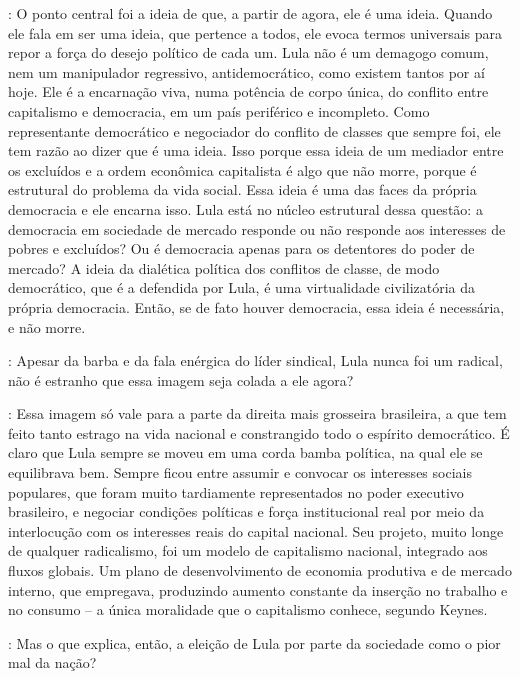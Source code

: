 \noindent{}: O ponto central foi a ideia de que, a partir de agora, ele é uma ideia.
Quando ele fala em ser uma ideia, que pertence a todos, ele evoca termos
universais para repor a força do desejo político de cada um. Lula não é
um demagogo comum, nem um manipulador regressivo, antidemocrático, como
existem tantos por aí hoje. Ele é a encarnação viva, numa potência de
corpo única, do conflito entre capitalismo e democracia, em um país
periférico e incompleto. Como representante democrático e negociador do
conflito de classes que sempre foi, ele tem razão ao dizer que é uma
ideia. Isso porque essa ideia de um mediador entre os excluídos e a
ordem econômica capitalista é algo que não morre, porque é estrutural do
problema da vida social. Essa ideia é uma das faces da própria
democracia e ele encarna isso. Lula está no núcleo estrutural dessa
questão: a democracia em sociedade de mercado responde ou não responde
aos interesses de pobres e excluídos? Ou é democracia apenas para os
detentores do poder de mercado? A ideia da dialética política dos
conflitos de classe, de modo democrático, que é a defendida por Lula, é
uma virtualidade civilizatória da própria democracia. Então, se de fato
houver democracia, essa ideia é necessária, e não morre.

\smallskip

\noindent{}: Apesar da barba e da fala enérgica do líder sindical, Lula nunca foi um
radical, não é estranho que essa imagem seja colada a ele agora?

\noindent{}: Essa imagem só vale para a parte da direita mais grosseira brasileira, a
que tem feito tanto estrago na vida nacional e constrangido todo o
espírito democrático. É claro que Lula sempre se moveu em uma corda
bamba política, na qual ele se equilibrava bem. Sempre ficou entre
assumir e convocar os interesses sociais populares, que foram muito
tardiamente representados no poder executivo brasileiro, e negociar
condições políticas e força institucional real por meio da interlocução
com os interesses reais do capital nacional. Seu projeto, muito longe de
qualquer radicalismo, foi um modelo de capitalismo nacional, integrado
aos fluxos globais. Um plano de desenvolvimento de economia produtiva e
de mercado interno, que empregava, produzindo aumento constante da
inserção no trabalho e no consumo -- a única moralidade que o
capitalismo conhece, segundo Keynes.

\smallskip

\noindent{}: Mas o que explica, então, a eleição de Lula por parte da sociedade como
o pior mal da nação?

